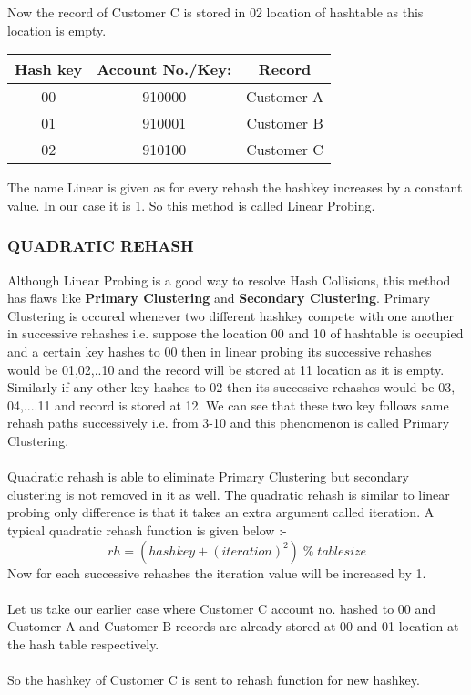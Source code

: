 \documentclass[12pt,a4paper]{article}
\begin{document}
\noindent Now the record of Customer C is stored in 02 location of hashtable as this location is empty.

\FloatBarrier
\begin{table}[H]

	\centering	
	\begin{tabular}{|c|c|c|} %

	\hline
	\textbf{Hash key} & \textbf{Account No./Key:} & \textbf{Record} \\

	\hline
	00 & 910000 & Customer A \\
	01 & 910001 & Customer B \\
	02 & 910100 & Customer C \\
	\hline

	\end{tabular}

\end{table}
\FloatBarrier

\noindent The name Linear is given as for every rehash the hashkey increases by a constant value. In our case it is 1. So this method is called Linear Probing.

\subsubsection{QUADRATIC REHASH}
Although Linear Probing is a good way to resolve Hash Collisions, this method has flaws like \textbf{Primary Clustering} and \textbf{Secondary Clustering}. Primary Clustering is occured whenever two different hashkey compete with one another in successive rehashes i.e. suppose the location 00 and 10 of hashtable is occupied and a certain key hashes to 00 then in linear probing its successive rehashes would be 01,02,..10 and the record will be stored at 11 location as it is empty. Similarly if any other key hashes to 02 then its successive rehashes would be 03, 04,....11 and record is stored at 12. We can see that these two key follows same rehash paths successively i.e. from 3-10 and this phenomenon is called Primary Clustering.\\ \\
Quadratic rehash is able to eliminate Primary Clustering but secondary clustering is not removed in it as well. The quadratic rehash is similar to linear probing only difference is that it takes an extra argument called iteration. A typical quadratic rehash function is given below :-
$$rh = (hashkey + (iteration)^2) \;\%\; tablesize$$
Now for each successive rehashes the iteration value will be increased by 1. \\ \\
Let us take our earlier case where Customer C account no. hashed to 00 and Customer A and Customer B records are already stored at 00 and 01 location at the hash table respectively. \\ \\
So the hashkey of Customer C is sent to rehash function for new hashkey.
\end{document}
